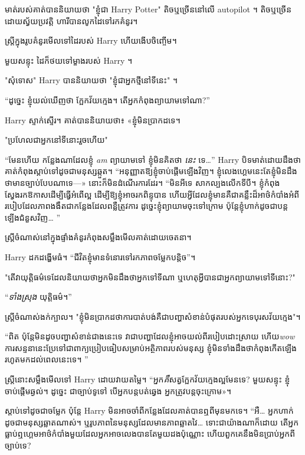 មាត់របស់គាត់បាននិយាយថា "ខ្ញុំជា Harry Potter" តិចឬច្រើននៅលើ autopilot ។ តិចឬច្រើនដោយស្វ័យប្រវត្តិ ហារីបានលូកដៃទៅរកគំនូរ។

ស្ត្រី​ក្នុង​រូប​គំនូរ​មើល​ទៅ​ដៃ​របស់ Harry ហើយ​ងើប​ចិញ្ចើម។

មួយសន្ទុះ ដៃក៏ថយទៅម្ខាងរបស់ Harry ។

"សុំទោស" Harry បាននិយាយថា "ខ្ញុំជាអ្នកថ្មីនៅទីនេះ" ។

“ដូច្នេះ ខ្ញុំយល់ឃើញថា ក្អែកវ័យក្មេង។ តើអ្នកកំពុងព្យាយាមទៅណា?”

Harry ស្ទាក់ស្ទើរ។ គាត់​បាន​និយាយ​ថា​៖ «​ខ្ញុំ​មិន​ប្រាកដ​ទេ​។

"ប្រហែលជាអ្នកនៅទីនោះរួចហើយ"

“មែនហើយ កន្លែងណាដែលខ្ញុំ \emph{am} ព្យាយាមទៅ ខ្ញុំមិនគិតថា \emph{នេះ} ទេ…” Harry បិទមាត់ដោយដឹងថាគាត់កំពុងស្តាប់ទៅដូចជាមនុស្សឆ្កួត។ “អនុញ្ញាតឱ្យខ្ញុំចាប់ផ្តើមឡើងវិញ។ ខ្ញុំ​លេង​ហ្គេម​នេះ​តែ​ខ្ញុំ​មិន​ដឹង​ថា​មាន​ច្បាប់​បែប​ណា​ទេ—» នោះ​ក៏​មិន​ដំណើរការ​ដែរ។ “មិនអីទេ សាកល្បងលើកទីបី។ ខ្ញុំកំពុងស្វែងរកឱកាសដើម្បីធ្វើអំពើល្អ ដើម្បីឱ្យខ្ញុំអាចរកពិន្ទុបាន ហើយអ្វីដែលខ្ញុំមានគឺជាគន្លឹះដ៏អាថ៌កំបាំងអំពីរបៀបដែលភាពងងឹតជាកន្លែងដែលពន្លឺត្រូវការ ដូច្នេះខ្ញុំព្យាយាមចុះទៅក្រោម ប៉ុន្តែខ្ញុំហាក់ដូចជាបន្តឡើងជំនួសវិញ… ”

ស្ត្រីចំណាស់នៅក្នុងផ្ទាំងគំនូរកំពុងសម្លឹងមើលគាត់ដោយចេតនា។

Harry ដកដង្ហើមធំ។ “ជីវិត​ខ្ញុំ​មាន​ទំនោរ​ទៅ​រក​ភាព​ចម្លែក​បន្តិច”។

"តើវាយុត្តិធម៌ទេដែលនិយាយថាអ្នកមិនដឹងថាអ្នកទៅទីណា ឬហេតុអ្វីបានជាអ្នកព្យាយាមទៅទីនោះ?"

“\emph{ទាំងស្រុង} យុត្តិធម៌។”

ស្ត្រីចំណាស់ងក់ក្បាល។ "ខ្ញុំ​មិន​ប្រាកដ​ថា​ការ​បាត់​បង់​គឺ​ជា​បញ្ហា​សំខាន់​បំផុត​របស់​អ្នក​ទេ​បុរស​វ័យ​ក្មេង"។

“ពិត ប៉ុន្តែមិនដូចបញ្ហាសំខាន់ជាងនេះទេ វាជាបញ្ហាដែលខ្ញុំអាចយល់ពីរបៀបដោះស្រាយ ហើយ\emph{wow} ការសន្ទនានេះប្រែទៅជាពាក្យប្រៀបធៀបសម្រាប់អត្ថិភាពរបស់មនុស្ស ខ្ញុំមិនទាំងដឹងថាកំពុងកើតឡើងរហូតមកដល់ពេលនេះទេ។ ”

ស្ត្រីនោះសម្លឹងមើលទៅ Harry ដោយវាយតម្លៃ។ “អ្នក\emph{គឺ}សត្វក្អែកវ័យក្មេងល្អមែនទេ? មួយសន្ទុះ ខ្ញុំចាប់ផ្តើមឆ្ងល់។ ដូច្នេះ ជា​ច្បាប់​ទូទៅ បើ​អ្នក​បន្ត​បត់​ឆ្វេង អ្នក​ត្រូវ​បន្ត​ចុះ​ក្រោម»។

ស្តាប់ទៅដូចជាចម្លែក ប៉ុន្តែ Harry មិនអាចចាំពីកន្លែងដែលគាត់បានឮពីមុនមកទេ។ “អឺ… អ្នកហាក់ដូចជាមនុស្សឆ្លាតណាស់។ ឬ​រូបភាព​នៃ​មនុស្ស​ដែល​មាន​ភាព​ឆ្លាត​វៃ… ទោះ​ជា​យ៉ាង​ណា​ក៏​ដោយ តើ​អ្នក​ធ្លាប់​ឮ​ហ្គេម​អាថ៌កំបាំង​មួយ​ដែល​អ្នក​អាច​លេង​បាន​តែ​មួយ​ដង​ប៉ុណ្ណោះ ហើយ​ពួកគេ​នឹង​មិន​ប្រាប់​អ្នក​ពី​ច្បាប់​ទេ?

